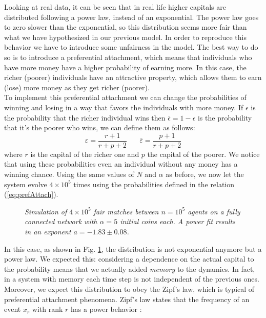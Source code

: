 Looking at real data, it can be seen that in real life higher capitals are distributed following a power law, instead of an exponential.
The power law goes to zero slower than the exponential, so this distribution seems more fair than what we have hypothesized in our previous model.
In order to reproduce this behavior we have to introduce some unfairness in the model.
The best way to do so is to introduce a preferential attachment, which means that individuals who have more money have a higher probability of earning more.
In this case, the richer (poorer) individuals have an attractive property, which allows them to earn (lose) more money as they get richer (poorer). \\
To implement this preferential attachment we can change the probabilities of winning and losing in a way that favors the individuals with more money.
If $\epsilon$ is the probability that the richer individual wins then $\bar{\epsilon} = 1 - \epsilon$ is the probability that it's the poorer who wins, we can define them as follows:
\begin{equation}
	\varepsilon = \frac{r + 1}{r + p + 2} \ \ \ \ \ \ \ \  \bar{\varepsilon} = \frac{p + 1}{r + p + 2}
	\label{eq:prefAttach}
\end{equation}
where $r$ is the capital of the richer one and $p$ the capital of the poorer.
We notice that using these probabilities even an individual without any money has a winning chance.
Using the same values of $N$ and $\alpha$ as before, we now let the system evolve $4 \times 10^5$ times using the probabilities defined in the relation (\ref{eq:prefAttach}).
\begin{figure}[H]
    \centering
    \scalebox{.7}{}
    \caption{\emph{Simulation of $4 \times 10^5$ fair matches between $n = 10^5$ agents on a fully connected network with $\alpha = 5$ initial coins each. 
                    A power fit results in an exponent $a = -1.83 \pm 0.08$.}}
    \label{fig:prefAttach}
\end{figure}
In this case, as shown in Fig. \ref{fig:prefAttach}, the distribution is not exponential anymore but a power law.
We expected this: considering a dependence on the actual capital to the probability means that we actually added \emph{memory} to the dynamics.
In fact, in a system with memory each time step is not independent of the previous ones.
\\Moreover, we expect this distribution to obey the Zipf's law, which is typical of preferential attachment phenomena.
Zipf's law states that the frequency of an event $x_r$ with rank $r$ has a power behavior \cite{zipf}:
